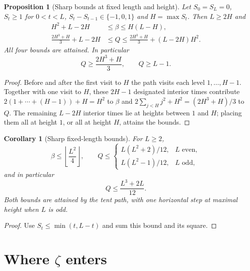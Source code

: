 \documentclass[11pt]{amsart}
\numberwithin{equation}{section}
\theoremstyle{plain}
\newtheorem{proposition}[theorem]{Proposition}
\newtheorem{corollary}[theorem]{Corollary}
\theoremstyle{definition}
\theoremstyle{remark}
\begin{document}
\begin{proposition}[Sharp bounds at fixed length and height]
\label{prop:sharp-LH}
Let $S_0=S_L=0$, $S_t\ge1$ for $0<t<L$, $S_t-S_{t-1}\in\{-1,0,1\}$ and
$H=\max S_t$. Then $L\ge2H$ and
\begin{align}
H^2+L-2H&\le\beta\le H(L-H),\label{eq:beta-LH}\\
\frac{2H^3+H}{3}+L-2H&\le Q\le
\frac{2H^3+H}{3}+(L-2H)H^2.\label{eq:Q-LH}
\end{align}
All four bounds are attained. In particular
\begin{equation}
\label{eq:height_Q_min}
Q\ge\frac{2H^3+H}{3},\qquad Q\ge L-1.
\end{equation}
\end{proposition}

\begin{proof}
Before and after the first visit to $H$ the path visits each level
$1,\dots,H-1$. Together with one visit to $H$, these $2H-1$ designated
interior times contribute $2(1+\cdots+(H-1))+H=H^2$ to $\beta$ and
$2\sum_{j<H}j^2+H^2=(2H^3+H)/3$ to $Q$. The remaining $L-2H$ interior times
lie at heights between $1$ and $H$; placing them all at height $1$, or all
at height $H$, attains the bounds.
\end{proof}

\begin{corollary}[Sharp fixed-length bounds]
\label{cor:fixed-L}
For $L\ge2$,
\[
\beta\le\left\lfloor\frac{L^2}{4}\right\rfloor,\qquad
Q\le
\begin{cases}
L(L^2+2)/12,&L\text{ even},\\
L(L^2-1)/12,&L\text{ odd},
\end{cases}
\]
and in particular
\begin{equation}
\label{eq:Q_upper}
Q\le\frac{L^3+2L}{12}.
\end{equation}
Both bounds are attained by the tent path, with one horizontal step at
maximal height when $L$ is odd.
\end{corollary}

\begin{proof}
Use $S_t\le\min(t,L-t)$ and sum this bound and its square.
\end{proof}

\section{Where \texorpdfstring{$\zeta$}{zeta} enters}
\label{sec:zeta}
\end{document}
